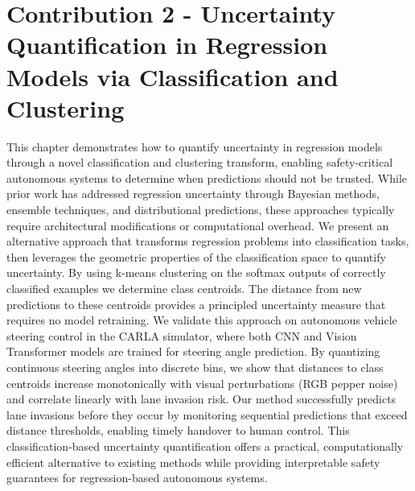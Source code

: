

\chapter{Contribution 2 - Uncertainty Quantification in Regression Models via Classification and Clustering}

This chapter demonstrates how to quantify uncertainty in regression models through a novel classification and clustering transform, enabling safety-critical autonomous systems to determine when predictions should not be trusted. While prior work has addressed regression uncertainty through Bayesian methods, ensemble techniques, and distributional predictions, these approaches typically require architectural modifications or computational overhead. We present an alternative approach that transforms regression problems into classification tasks, then leverages the geometric properties of the classification space to quantify uncertainty. By using k-means clustering on the softmax outputs of correctly classified examples we determine class centroids. The distance from new predictions to these centroids provides a principled uncertainty measure that requires no model retraining. We validate this approach on autonomous vehicle steering control in the CARLA simulator, where both CNN and Vision Transformer models are trained for steering angle prediction. By quantizing continuous steering angles into discrete bins, we show that distances to class centroids increase monotonically with visual perturbations (RGB pepper noise) and correlate linearly with lane invasion risk. Our method successfully predicts lane invasions before they occur by monitoring sequential predictions that exceed distance thresholds, enabling timely handover to human control. This classification-based uncertainty quantification offers a practical, computationally efficient alternative to existing methods while providing interpretable safety guarantees for regression-based autonomous systems.


